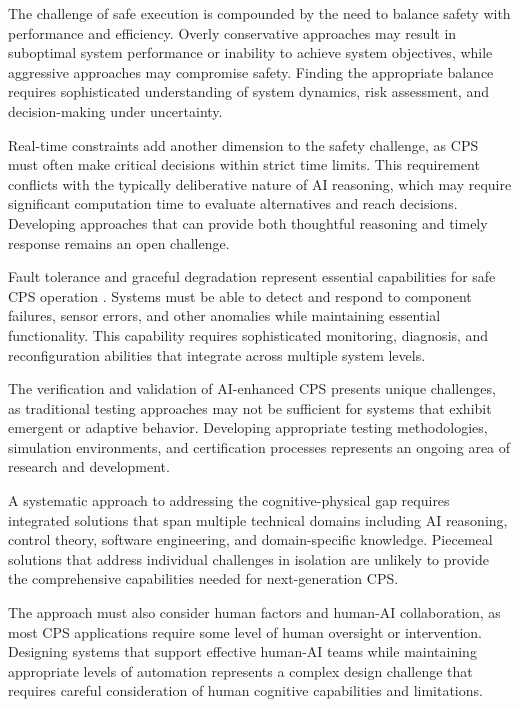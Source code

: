 The challenge of safe execution is compounded by the need to balance safety with performance and efficiency. Overly conservative approaches may result in suboptimal system performance or inability to achieve system objectives, while aggressive approaches may compromise safety. Finding the appropriate balance requires sophisticated understanding of system dynamics, risk assessment, and decision-making under uncertainty.

Real-time constraints add another dimension to the safety challenge, as CPS must often make critical decisions within strict time limits. This requirement conflicts with the typically deliberative nature of AI reasoning, which may require significant computation time to evaluate alternatives and reach decisions. Developing approaches that can provide both thoughtful reasoning and timely response remains an open challenge.

Fault tolerance and graceful degradation represent essential capabilities for safe CPS operation \cite{avizienis2004basic, powell1992delta}. Systems must be able to detect and respond to component failures, sensor errors, and other anomalies while maintaining essential functionality. This capability requires sophisticated monitoring, diagnosis, and reconfiguration abilities that integrate across multiple system levels.

The verification and validation of AI-enhanced CPS presents unique challenges, as traditional testing approaches may not be sufficient for systems that exhibit emergent or adaptive behavior. Developing appropriate testing methodologies, simulation environments, and certification processes represents an ongoing area of research and development.

A systematic approach to addressing the cognitive-physical gap requires integrated solutions that span multiple technical domains including AI reasoning, control theory, software engineering, and domain-specific knowledge. Piecemeal solutions that address individual challenges in isolation are unlikely to provide the comprehensive capabilities needed for next-generation CPS.

The approach must also consider human factors and human-AI collaboration, as most CPS applications require some level of human oversight or intervention. Designing systems that support effective human-AI teams while maintaining appropriate levels of automation represents a complex design challenge that requires careful consideration of human cognitive capabilities and limitations.

